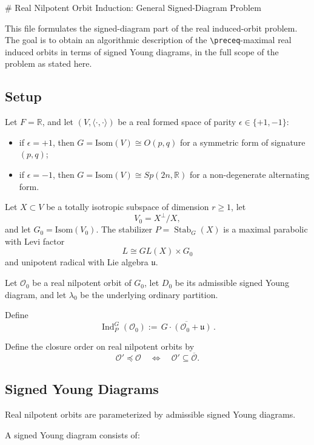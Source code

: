 \documentclass[
]{article}
\providecommand{\tightlist}{%
  \setlength{\itemsep}{0pt}\setlength{\parskip}{0pt}}
\begin{document}
\# Real Nilpotent Orbit Induction: General Signed-Diagram Problem

This file formulates the signed-diagram part of the real induced-orbit
problem. The goal is to obtain an algorithmic description of the
\texttt{\textbackslash{}preceq}-maximal real induced orbits in terms of
signed Young diagrams, in the full scope of the problem as stated here.

\subsection{Setup}\label{setup}

Let \(F=\mathbb{R}\), and let \((V,\langle\cdot,\cdot\rangle)\) be a
real formed space of parity \(\epsilon\in\{+1,-1\}\):

\begin{itemize}
\tightlist
\item
  if \(\epsilon=+1\), then \(G=\mathrm{Isom}(V)\cong O(p,q)\) for a
  symmetric form of signature \((p,q)\);
\item
  if \(\epsilon=-1\), then \(G=\mathrm{Isom}(V)\cong Sp(2n,\mathbb R)\)
  for a non-degenerate alternating form.
\end{itemize}

Let \(X\subset V\) be a totally isotropic subspace of dimension
\(r\ge 1\), let \[
V_0=X^\perp/X,
\] and let \(G_0=\mathrm{Isom}(V_0)\). The stabilizer
\(P=\operatorname{Stab}_G(X)\) is a maximal parabolic with Levi factor
\[
L\cong GL(X)\times G_0
\] and unipotent radical with Lie algebra \(\mathfrak u\).

Let \(\mathcal O_0\) be a real nilpotent orbit of \(G_0\), let \(D_0\)
be its admissible signed Young diagram, and let \(\lambda_0\) be the
underlying ordinary partition.

Define \[
\operatorname{Ind}_P^G(\mathcal O_0):=\overline{\,G\cdot(\mathcal O_0+\mathfrak u)\,}.
\]

Define the closure order on real nilpotent orbits by \[
\mathcal O' \preceq \mathcal O
\quad\Longleftrightarrow\quad
\mathcal O' \subseteq \overline{\mathcal O}.
\]

\subsection{Signed Young Diagrams}\label{signed-young-diagrams}

Real nilpotent orbits are parameterized by admissible signed Young
diagrams.

A signed Young diagram consists of:
\end{document}

